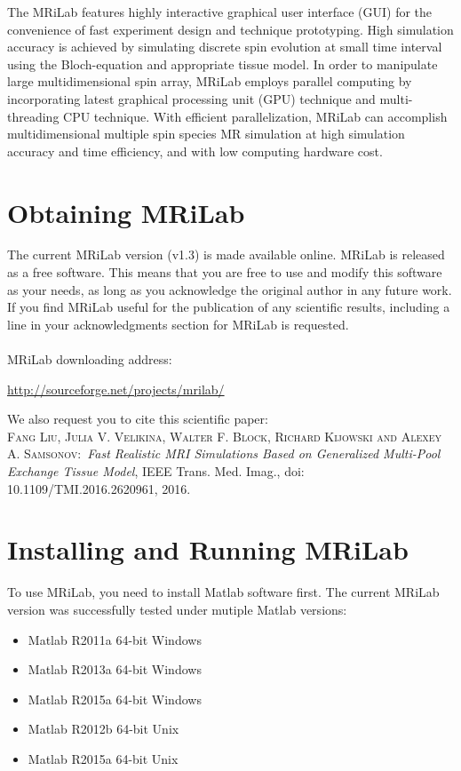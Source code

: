 \documentclass{book}%
\begin{document}
The MRiLab features highly interactive graphical user interface (GUI) for the convenience of fast experiment design and technique prototyping. High simulation accuracy is achieved by simulating discrete spin evolution at small time interval using the Bloch-equation and appropriate tissue model. In order to manipulate large multidimensional spin array, MRiLab employs parallel computing by incorporating latest graphical processing unit (GPU) technique and multi-threading CPU technique. With efficient parallelization, MRiLab can accomplish multidimensional multiple spin species MR simulation at high simulation accuracy and time efficiency, and with low computing hardware cost. 

\section{Obtaining MRiLab}
The current MRiLab version (v1.3) is made available online. MRiLab is released as a free software. This means that you are free to use and modify this software as your needs, as long as you acknowledge the original author in any future work. If you find MRiLab useful for the publication of any scientific results, including a line in your acknowledgments section for MRiLab is requested.\\
\\
MRiLab downloading address:
\begin{center}
\url{http://sourceforge.net/projects/mrilab/}
\end{center}

We also request you to cite this scientific paper:\\

\textsc{Fang Liu, Julia V. Velikina, Walter F. Block, Richard Kijowski and Alexey A. Samsonov}:\
\textit{Fast Realistic MRI Simulations Based on Generalized Multi-Pool Exchange Tissue Model}, IEEE Trans. Med. Imag., doi: 10.1109/TMI.2016.2620961, 2016.

\section{Installing and Running MRiLab}

To use MRiLab, you need to install Matlab software first. The current MRiLab version was successfully tested under mutiple Matlab versions:

\begin{itemize}
\item Matlab R2011a 64-bit Windows
\item Matlab R2013a 64-bit Windows
\item Matlab R2015a 64-bit Windows
\item Matlab R2012b 64-bit Unix
\item Matlab R2015a 64-bit Unix
\end{itemize}
\end{document}

